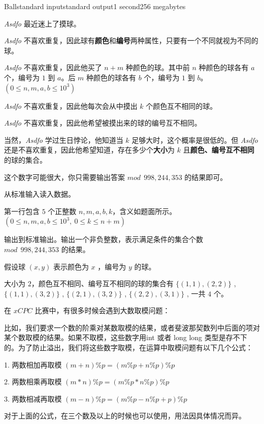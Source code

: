 \documentclass[12pt,a4paper,oneside]{article}
\begin{document}
	\begin{problem}{Ball}{standard input}{standard output}{1 second}{256 megabytes}
		
	\textit{Asdfo} 最近迷上了摸球。

        \textit{Asdfo} 不喜欢重复，因此球有\textbf{颜色}和\textbf{编号}两种属性，只要有一个不同就视为不同的球。
        
        \textit{Asdfo} 不喜欢重复，因此他买了 $n + m$ 种颜色的球。其中前 $n$ 种颜色的球各有 $a$ 个，编号为 $1$ 到 $a$。后 $m$ 种颜色的球各有 $b$ 个，编号为 $1$ 到 $b$。$(0 \le n, m, a, b \le 10^3 )$ 
        
        \textit{Asdfo} 不喜欢重复，因此他每次会从中摸出 $k$ 个颜色互不相同的球。
        
        \textit{Asdfo} 不喜欢重复，因此他希望被摸出来的球的编号互不相同。
        
        当然，\textit{Asdfo} 学过生日悖论，他知道当 $k$ 足够大时，这个概率是很低的。但 \textit{Asdfo} 还是不喜欢重复，因此他希望知道，存在多少个\textbf{大小}为 $k$ 且\textbf{颜色、编号互不相同}的球的集合。

        这个数字可能很大，你只需要输出答案 $mod \ \ 998, 244, 353 $ 的结果即可。
	
	\InputFile
	从标准输入读入数据。

        第一行包含 $5$ 个正整数 $n, m, a, b, k$，含义如题面所示。$(0 \le n, m, a, b \le 10^3, \ 0 \le k \le n + m)$
	
	\OutputFile
	输出到标准输出。输出一个非负整数，表示满足条件的集合个数 $mod \ \ 998, 244, 353$ 的结果。
	
	\Example
	\begin{example}
	\end{example}
        \Explanations
        假设球 $(x, y)$ 表示颜色为 $x$ ，编号为 $y$  的球。

        大小为 $2$，颜色互不相同、编号互不相同的球的集合有 $\{{(1, 1),(2, 2)}\}$ , $\{{(1, 1),(3, 2)}\}$ , $\{{(2, 1),(3, 2)}\}$ , $\{{(2, 2), (3, 1)}\}$ , 一共 $4$ 个。
        
        \newpage
	\Note
        在 $xCPC$ 比赛中，有很多时候会遇到大数取模问题：

        比如，我们要求一个数的阶乘对某数取模的结果，或者斐波那契数列中后面的项对某个数取模的结果。如果不取模，这些数字用int 或者 long long 类型是存不下的。为了防止溢出，我们将这些数字取模，在运算中取模问题有以下几个公式：
        
            1. 两数相加再取模
               $(m + n) \% p = (m\%p + n\%p) \%p$
               
            2. 两数相乘再取模
               $(m * n) \% p = (m\%p * n\%p) \%p$
               
            3. 两数相减再取模
               $(m - n) \% p = (m\%p - n\%p + p) \%p$
               

        对于上面的公式，在三个数及以上的时候也可以使用，用法因具体情况而异。
	\end{problem}


\end{document}

